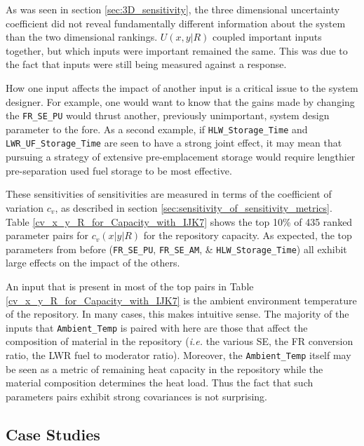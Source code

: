 \documentclass[a4paper, 12pt]{article}
\begin{document}
As was seen in section \ref{sec:3D_sensitivity}, the three dimensional uncertainty coefficient did not reveal fundamentally different information
about the system than the two dimensional rankings.  $U(x,y|R)$ coupled important inputs together, but which inputs were important remained the same.  This was
due to the fact that inputs were still being measured against a response.

How one input affects the impact of another input is a critical issue to the system designer.  For example, one would want to know that the gains made by
changing the \texttt{FR\_SE\_PU} would thrust another, previously unimportant, system design parameter to the fore.  As a second example, if \texttt{HLW\_Storage\_Time} and \texttt{LWR\_UF\_Storage\_Time} are seen to have a strong joint effect, it may mean that pursuing a strategy of extensive pre-emplacement storage would require lengthier pre-separation used fuel storage to be most effective.



These sensitivities of sensitivities are measured in terms of the coefficient of variation $c_v$, as described in section \ref{sec:sensitivity_of_sensitivity_metrics}.
Table \ref{cv_x_y_R_for_Capacity_with_IJK7} shows the top 10\% of 435 ranked parameter pairs for $c_v(x|y|R)$ for the repository capacity.
As expected, the top parameters from before (\texttt{FR\_SE\_PU}, \texttt{FR\_SE\_AM}, \& \texttt{HLW\_Storage\_Time}) all exhibit large effects on
the impact of the others.

An input that is present in most of the top pairs in Table \ref{cv_x_y_R_for_Capacity_with_IJK7} is the
ambient environment temperature of the repository.
In many cases, this makes intuitive sense.  The majority of the inputs that \texttt{Ambient\_Temp} is paired with here are those that affect the composition of
material in the repository (\emph{i.e.} the various SE, the FR conversion ratio, the LWR fuel to moderator ratio).
Moreover, the \texttt{Ambient\_Temp} itself may be seen as a metric of remaining heat capacity in the repository while the material composition determines the heat load.
Thus the fact that such parameters pairs exhibit strong covariances is not surprising.



\subsection{Case Studies}
\label{sec:case_studies}
\end{document}
